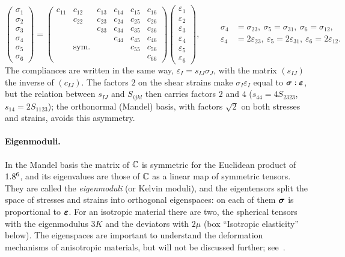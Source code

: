 \begin{equation}\label{eq:voigt-c}
 \begin{pmatrix}\sigma_1\\ \sigma_2\\ \sigma_3\\ \sigma_4\\ \sigma_5\\ \sigma_6\end{pmatrix}
 =
 \begin{pmatrix}
   c_{11} & c_{12} & c_{13} & c_{14} & c_{15} & c_{16} \\
          & c_{22} & c_{23} & c_{24} & c_{25} & c_{26} \\
          &        & c_{33} & c_{34} & c_{35} & c_{36} \\
          &        &        & c_{44} & c_{45} & c_{46} \\
          & \text{sym.} &   &        & c_{55} & c_{56} \\
          &        &        &        &        & c_{66}
 \end{pmatrix}
 \begin{pmatrix}\varepsilon_1\\ \varepsilon_2\\ \varepsilon_3\\ \varepsilon_4\\ \varepsilon_5\\ \varepsilon_6\end{pmatrix},
 \qquad
 \begin{aligned}
 \sigma_4&=\sigma_{23},\ \sigma_5=\sigma_{31},\ \sigma_6=\sigma_{12},\\
 \varepsilon_4&=2\varepsilon_{23},\ \varepsilon_5=2\varepsilon_{31},\ \varepsilon_6=2\varepsilon_{12}.
 \end{aligned}
\end{equation}
The compliances are written in the same way, $\varepsilon_I=s_{IJ}\sigma_J$,
with the matrix $(s_{IJ})$ the inverse of $(c_{IJ})$. The factors $2$ on the shear strains make
$\sigma_I\varepsilon_I$ equal to $\bm{\sigma}:\bm{\varepsilon}$, but the relation between
$s_{IJ}$ and $S_{ijkl}$ then carries factors $2$ and $4$
($s_{44}=4S_{2323}$, $s_{14}=2S_{1123}$); the orthonormal (Mandel) basis, with
factors $\sqrt2$ on both stresses and strains, avoids this asymmetry.

\paragraph{Eigenmoduli.}
%
In the Mandel basis the matrix of $\mathbb{C}$ is symmetric for the Euclidean
product of $1.8^6$, and its eigenvalues are those of $\mathbb{C}$ as a linear map of
symmetric tensors. They are called the \emph{eigenmoduli} (or Kelvin
moduli), and the eigentensors split the space of stresses and strains into
orthogonal eigenspaces: on each of them $\bm{\sigma}$ is proportional to $\bm{\varepsilon}$. For
an isotropic material there are two, the spherical tensors with the
eigenmodulus $3K$ and the deviators with $2\mu$ (box ``Isotropic elasticity''
below). The eigenspaces are important to understand the deformation
mechanisms of anisotropic materials, but will not be discussed further;
see~\cite{CowinMehrabadi1987,MehrabadiCowin1990}.

